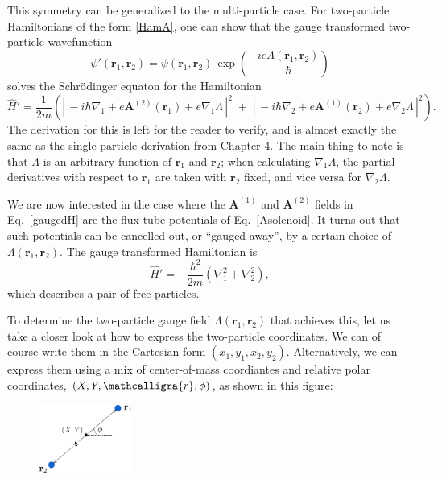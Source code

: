 \documentclass[pra,12pt]{revtex4}
\begin{document}
This symmetry can be generalized to the multi-particle case.  For
two-particle Hamiltonians of the form \eqref{HamA}, one can show that
the gauge transformed two-particle wavefunction
\begin{equation}
  \psi'(\mathbf{r}_1, \mathbf{r}_2) = \psi(\mathbf{r}_1, \mathbf{r}_2)
  \, \exp\!\left(-\frac{ie\Lambda(\mathbf{r}_1, \mathbf{r}_2)}{\hbar}\right)
\end{equation}
solves the Schr\"odinger equaton for the Hamiltonian
\begin{equation}
  \hat{H}' = \frac{1}{2m} \left( \left| \, -i\hbar \nabla_1
  + e\mathbf{A}^{(2)}(\mathbf{r}_1) + e \nabla_1 \Lambda\,\right|^2
  \;+\; \left| \, -i\hbar \nabla_2
  + e\mathbf{A}^{(1)}(\mathbf{r}_2) + e \nabla_2\Lambda\,\right|^2\right).
  \label{gaugedH}
\end{equation}
The derivation for this is left for the reader to verify, and is
almost exactly the same as the single-particle derivation from Chapter
4.  The main thing to note is that $\Lambda$ is an arbitrary function
of $\mathbf{r}_1$ and $\mathbf{r}_2$; when calculating
$\nabla_1\Lambda$, the partial derivatives with respect to
$\mathbf{r}_1$ are taken with $\mathbf{r}_2$ fixed, and vice versa for
$\nabla_2\Lambda$.

We are now interested in the case where the $\mathbf{A}^{(1)}$ and
$\mathbf{A}^{(2)}$ fields in Eq.~\eqref{gaugedH} are the flux tube
potentials of Eq.~\eqref{Asolenoid}.  It turns out that such
potentials can be cancelled out, or ``gauged away'', by a certain
choice of $\Lambda(\mathbf{r}_1, \mathbf{r}_2)$.  The gauge
transformed Hamiltonian is
\begin{equation}
  \hat{H}' = - \frac{\hbar^2}{2m} \left( \nabla_1^2 + \nabla_2^2\right),
  \label{gaugedH2}
\end{equation}
which describes a pair of free particles.

\clearpage
To determine the two-particle gauge field
$\Lambda(\mathbf{r}_1,\mathbf{r}_2)$ that achieves this, let us take a
closer look at how to express the two-particle coordinates.  We can of
course write them in the Cartesian form $(x_1, y_1, x_2, y_2)$.
Alternatively, we can express them using a mix of center-of-mass
coordiantes and relative polar coordinates, $(X, Y, \mathcalligra{r},
\phi)$, as shown in this figure:

\begin{figure}[h]
  \centering\includegraphics[width=0.27\textwidth]{anyon-coordinates}
\end{figure}
\end{document}
